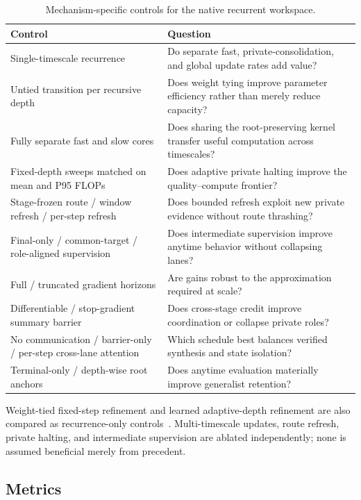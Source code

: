 \documentclass[10pt,a4paper]{article}
\begin{document}
\begin{table}[htbp]
\caption{Mechanism-specific controls for the native recurrent workspace.}
\label{tab:controls}
\centering\small
\begin{tabularx}{\textwidth}{@{}>{\raggedright\arraybackslash}p{}X@{}}
\toprule
\textbf{Control} & \textbf{Question} \\
\midrule
Single-timescale recurrence & Do separate fast, private-consolidation, and global update rates add value? \\
Untied transition per recursive depth & Does weight tying improve parameter efficiency rather than merely reduce capacity? \\
Fully separate fast and slow cores & Does sharing the root-preserving kernel transfer useful computation across timescales? \\
Fixed-depth sweeps matched on mean and P95 FLOPs & Does adaptive private halting improve the quality--compute frontier? \\
Stage-frozen route / window refresh / per-step refresh & Does bounded refresh exploit new private evidence without route thrashing? \\
Final-only / common-target / role-aligned supervision & Does intermediate supervision improve anytime behavior without collapsing lanes? \\
Full / truncated gradient horizons & Are gains robust to the approximation required at scale? \\
Differentiable / stop-gradient summary barrier & Does cross-stage credit improve coordination or collapse private roles? \\
No communication / barrier-only / per-step cross-lane attention & Which schedule best balances verified synthesis and state isolation? \\
Terminal-only / depth-wise root anchors & Does anytime evaluation materially improve generalist retention? \\
\bottomrule
\end{tabularx}
\end{table}

Weight-tied fixed-step refinement and learned adaptive-depth refinement are
also compared as recurrence-only controls~\cite{graves2016,dehghani2019}.
Multi-timescale updates, route refresh, private halting, and intermediate
supervision are ablated independently; none is assumed beneficial merely from
precedent.

\subsection{Metrics}
\end{document}
